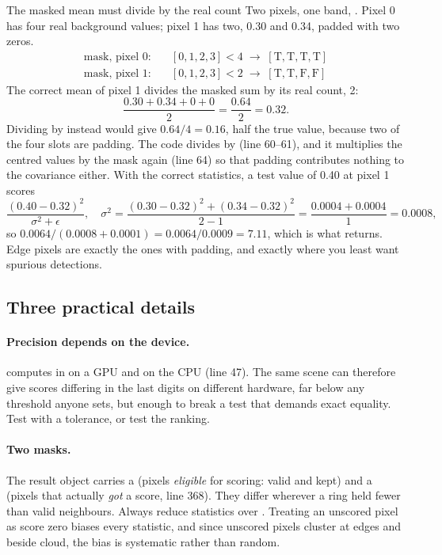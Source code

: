 \begin{worked}[label={we:localrx:padding}]{The masked mean must divide by the real count}
Two pixels, one band, . Pixel 0 has four real background values; pixel 1 has two,
0.30 and 0.34, padded with two zeros.
\begin{align*}
\text{mask, pixel 0:}&\quad [0,1,2,3] < 4 \;\to\; [\text{T},\text{T},\text{T},\text{T}]\\
\text{mask, pixel 1:}&\quad [0,1,2,3] < 2 \;\to\; [\text{T},\text{T},\text{F},\text{F}]
\end{align*}
The correct mean of pixel 1 divides the masked sum by its real count, 2:
\[
\frac{0.30 + 0.34 + 0 + 0}{2} = \frac{0.64}{2} = 0.32 .
\]
Dividing by  instead would give $0.64/4 = 0.16$, half the true value, because two of the
four slots are padding. The code divides by  (line 60--61), and it multiplies the
centred values by the mask again (line 64) so that padding contributes nothing to the covariance
either. With the correct statistics, a test value of 0.40 at pixel 1 scores
\[
\frac{(0.40 - 0.32)^2}{\sigma^2 + \epsilon},\quad
\sigma^2 = \frac{(0.30 - 0.32)^2 + (0.34 - 0.32)^2}{2 - 1} = \frac{0.0004 + 0.0004}{1} = 0.0008,
\]
so $0.0064/(0.0008 + 0.0001) = 0.0064/0.0009 = 7.11$, which is what 
returns\tagC. Edge pixels are exactly the ones with padding, and exactly where you least want
spurious detections.
\end{worked}

\subsection{Three practical details}

\paragraph{Precision depends on the device.}  computes in  on a
GPU and  on the CPU (line 47). The same scene can therefore give scores differing in the
last digits on different hardware, far below any threshold anyone sets, but enough to break a test
that demands exact equality. Test with a tolerance, or test the ranking.

\paragraph{Two masks.} The result object carries a  (pixels \emph{eligible} for
scoring: valid and kept) and a  (pixels that actually \emph{got} a score,
 line 368). They differ wherever a ring held fewer than 
valid neighbours. Always reduce statistics over . Treating an unscored pixel as
score zero biases every statistic, and since unscored pixels cluster at edges and beside cloud, the
bias is systematic rather than random.

